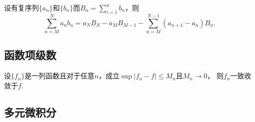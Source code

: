   \begin{thm}[分部求和]
    \label{thm: 分部求和}
    设有复序列$\{a_n\}$和$\{b_n\}$而$B_n=\sum_{i=1}^nb_n$，则
    \[
      \sum_{n=M}^N a_nb_n = a_NB_N - a_MB_{M-1} -
      \sum_{n=M}^{N-1}(a_{n+1}-a_n)B_n.
    \]
  \end{thm}

\subsection{函数项级数}

  \begin{thm}
    设$\{f_n\}$是一列函数且对于任意$n$，成立$\sup|f_n-f|\le M_n$且$M_n\to 0$，
    则$f_n$一致收敛于$f$.
  \end{thm}

\subsection{多元微积分}

